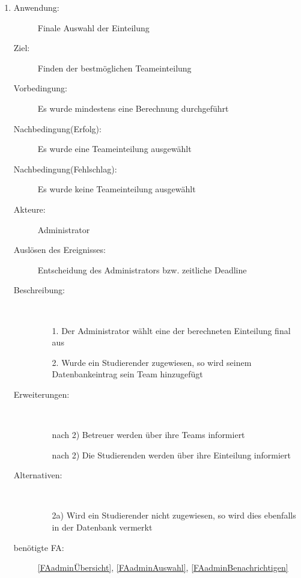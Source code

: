 \documentclass[parskip=full]{scrartcl}
\newcommand{\swtLabel}[1]{\textbf{/#1\arabic*0/}}
\begin{document}
\begin{enumerate} [label=\swtLabel{A}]
  
  \item
  \begin{description}
  \item[Anwendung:] Finale Auswahl der Einteilung
  \item[Ziel:] Finden der bestmöglichen Teameinteilung
  	\item[Vorbedingung:] Es wurde mindestens eine Berechnung durchgeführt
  	\item[Nachbedingung(Erfolg):] Es wurde eine Teameinteilung ausgewählt
  	\item[Nachbedingung(Fehlschlag):] Es wurde keine Teameinteilung ausgewählt
  	\item[Akteure:] Administrator
  	\item[Auslösen des Ereignisses:] Entscheidung des Administrators bzw.
  	zeitliche Deadline
  	\item[Beschreibung:]~
  	\begin{enumerate} 
  	  \item[1.] Der Administrator wählt eine der berechneten Einteilung final aus
  	  \item[2.] Wurde ein Studierender zugewiesen, so wird seinem
  	  Datenbankeintrag sein Team hinzugefügt
  	\end{enumerate}
  	\item[Erweiterungen:]~
  	\begin{enumerate}
  	  \item[nach 2)] Betreuer werden über ihre Teams informiert
  	  \item[nach 2)] Die Studierenden werden über ihre Einteilung informiert
  	 \end{enumerate}
  	\item[Alternativen:] ~
  	\begin{enumerate}
  	  \item[2a)] Wird ein Studierender nicht zugewiesen, so wird dies ebenfalls
  	  in der Datenbank vermerkt
  	 \end{enumerate}  
  	 \item[benötigte FA:] \ref{FAadminÜbersicht}, \ref{FAadminAuswahl},
  	 \ref{FAadminBenachrichtigen}
  \end{description}
   

\end{enumerate}
\end{document}
